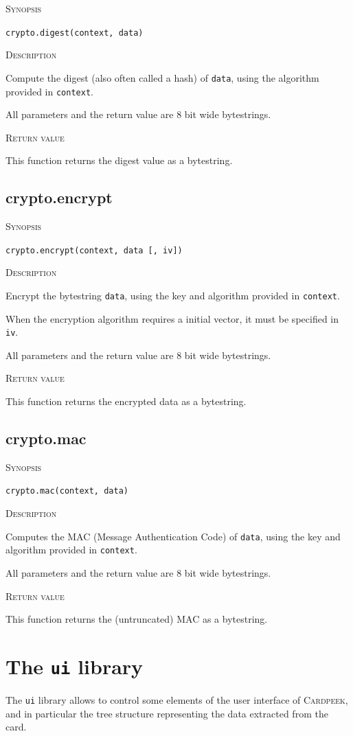 \documentclass[11pt]{report}
\newcommand{\mansection}[1]{\vspace{0.5em}\par\noindent\textsc{#1}\vspace{0.5em}\par}
\newcommand{\syn}[1]{\texttt{#1}}
\newcommand{\Cardpeek}{\textsc{Cardpeek}}
\begin{document}
\mansection{Synopsis}
\syn{crypto.digest(context, data)}

\mansection{Description}
Compute the digest (also often called a hash) of \syn{data}, using the algorithm provided in \syn{context}.

All parameters and the return value are 8 bit wide bytestrings.

\mansection{Return value}
This function returns the digest value as a bytestring.

\subsection{crypto.encrypt}

\mansection{Synopsis}
\syn{crypto.encrypt(context, data [, iv])}

\mansection{Description}
Encrypt the bytestring \syn{data}, using the key and algorithm provided in \syn{context}. 

When the encryption algorithm requires a initial vector, it must be specified in \syn{iv}.

All parameters and the return value are 8 bit wide bytestrings.

\mansection{Return value}
This function returns the encrypted data as a bytestring.

\subsection{crypto.mac}

\mansection{Synopsis}
\syn{crypto.mac(context, data)}

\mansection{Description}
Computes the MAC (Message Authentication Code) of \syn{data}, using the key and algorithm provided in \syn{context}.

All parameters and the return value are 8 bit wide bytestrings.

\mansection{Return value}
This function returns the (untruncated) MAC as a bytestring.


\section{The \syn{ui} library}

The \syn{ui} library allows to control some elements of the user interface of 
\Cardpeek, and in particular the tree structure representing the data 
extracted from the card.
\end{document}
